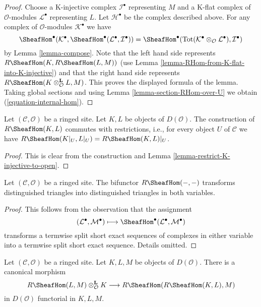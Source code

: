 \begin{proof}
Choose a K-injective complex $\mathcal{I}^\bullet$ representing
$M$ and a K-flat complex of $\mathcal{O}$-modules $\mathcal{L}^\bullet$
representing $L$. Let $\mathcal{H}^\bullet$ be the complex described above.
For any complex of $\mathcal{O}$-modules $\mathcal{K}^\bullet$
we have
$$
\SheafHom^\bullet(\mathcal{K}^\bullet,
\SheafHom^\bullet(\mathcal{L}^\bullet, \mathcal{I}^\bullet))
=
\SheafHom^\bullet(
\text{Tot}(\mathcal{K}^\bullet \otimes_\mathcal{O} \mathcal{L}^\bullet),
\mathcal{I}^\bullet)
$$
by Lemma \ref{lemma-compose}.
Note that the left hand side represents
$R\SheafHom(K, R\SheafHom(L, M))$ (use
Lemma \ref{lemma-RHom-from-K-flat-into-K-injective})
and that the right hand side represents
$R\SheafHom(K \otimes_\mathcal{O}^\mathbf{L} L, M)$.
This proves the displayed formula of the lemma.
Taking global sections and using Lemma \ref{lemma-section-RHom-over-U}
we obtain (\ref{equation-internal-hom}).
\end{proof}

\begin{lemma}
\label{lemma-restriction-RHom-to-U}
Let $(\mathcal{C}, \mathcal{O})$ be a ringed site. Let $K, L$ be objects
of $D(\mathcal{O})$. The construction of $R\SheafHom(K, L)$
commutes with restrictions, i.e.,
for every object $U$ of $\mathcal{C}$ we have
$R\SheafHom(K|_U, L|_U) = R\SheafHom(K, L)|_U$.
\end{lemma}

\begin{proof}
This is clear from the construction and
Lemma \ref{lemma-restrict-K-injective-to-open}.
\end{proof}

\begin{lemma}
\label{lemma-RHom-triangulated}
Let $(\mathcal{C}, \mathcal{O})$ be a ringed site. The bifunctor
$R\SheafHom(- , -)$ transforms distinguished triangles into
distinguished triangles in both variables.
\end{lemma}

\begin{proof}
This follows from the observation that the assignment
$$
(\mathcal{L}^\bullet, \mathcal{M}^\bullet) \longmapsto
\SheafHom^\bullet(\mathcal{L}^\bullet, \mathcal{M}^\bullet)
$$
transforms a termwise split short exact sequences of complexes in either
variable into a termwise split short exact sequence. Details omitted.
\end{proof}

\begin{lemma}
\label{lemma-internal-hom-evaluate}
Let $(\mathcal{C}, \mathcal{O})$ be a ringed site. Let $K, L, M$ be objects of
$D(\mathcal{O})$. There is a canonical morphism
$$
R\SheafHom(L, M) \otimes_\mathcal{O}^\mathbf{L} K
\longrightarrow
R\SheafHom(R\SheafHom(K, L), M)
$$
in $D(\mathcal{O})$ functorial in $K, L, M$.
\end{lemma}

